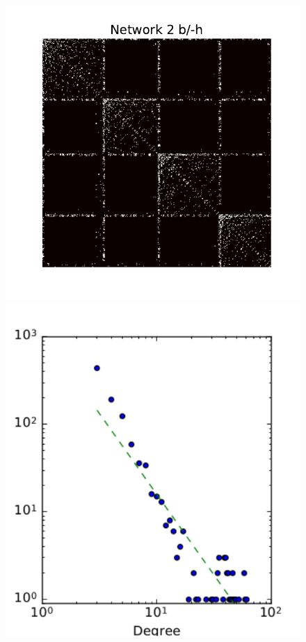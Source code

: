 \begin{figure}[h]
	\endminipage
	\vspace{-0.4cm}
	\includegraphics[scale=0.32]{img/g2}
	\endminipage
	\includegraphics[scale=0.32]{img/g2_d}
	\endminipage


\end{figure}
